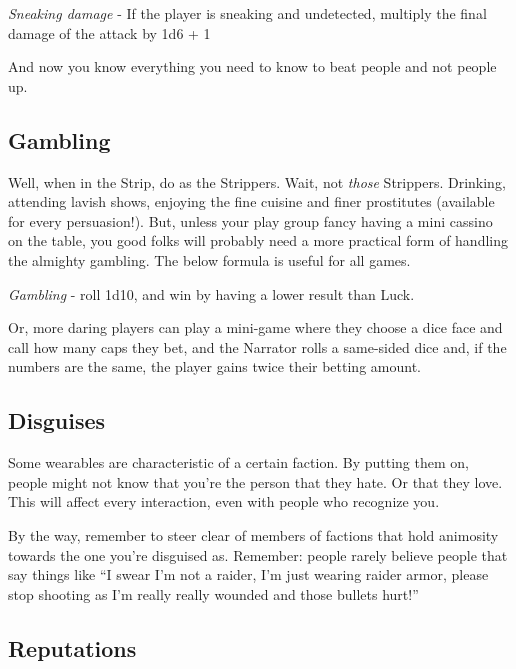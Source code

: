 \documentclass[11pt]{article} %
\begin{document}
\begin{center}
        \textit{Sneaking damage} - If the player is sneaking and undetected, multiply the final damage of the attack by 1d6 + 1
\end{center}        

And now you know everything you need to know to beat people and not people up.

\subsection{Gambling}

Well, when in the Strip, do as the Strippers. Wait, not \textit{those} Strippers. Drinking, attending lavish shows, enjoying the fine cuisine and finer prostitutes (available for every persuasion!). But, unless your play group fancy having a mini cassino on the table, you good folks will probably need a more practical form of handling the almighty gambling. The below formula is useful for all games.

\begin{center}
	\textit{Gambling} - roll 1d10, and win by having a lower result than Luck.
\end{center}

Or, more daring players can play a mini-game where they choose a dice face and call how many caps they bet, and the Narrator rolls a same-sided dice and, if the numbers are the same, the player gains twice their betting amount.

\subsection{Disguises}

Some wearables are characteristic of a certain faction. By putting them on, people might not know that you're the person that they hate. Or that they love. This will affect every interaction, even with people who recognize you.

By the way, remember to steer clear of members of factions that hold animosity towards the one you're disguised as. Remember: people rarely believe people that say things like ``I swear I'm not a raider, I'm just wearing raider armor, please stop shooting as I'm really really wounded and those bullets hurt!''

\subsection{Reputations} 
\end{document}
